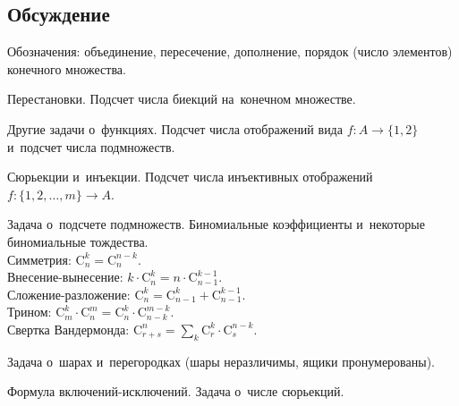 


\begingroup
    \def\binom#1#2{\mathrm{C}_{#1}^{#2}}%


\subsection*{Обсуждение}

\begin{exercises}

\item
Обозначения: объединение, пересечение, дополнение, порядок (число элементов)
конечного множества.

\item
Перестановки.
Подсчет числа биекций на~конечном множестве.

\item
Другие задачи о~функциях.
Подсчет числа отображений вида $f \colon A \to \{1, 2\}$ и~подсчет числа
подмножеств.

\item
Сюрьекции и~инъекции.
Подсчет числа инъективных отображений $f \colon \{1, 2, \ldots, m\} \to A$.

\item
Задача о~подсчете подмножеств.
Биномиальные коэффициенты и~некоторые биномиальные тождества.
\\
Симметрия: $\binom{n}{k} = \binom{n}{n-k}$.
\\
Внесение-вынесение: $k \cdot \binom{n}{k} = n \cdot \binom{n-1}{k-1}$.
\\
Сложение-разложение: $\binom{n}{k} = \binom{n-1}{k} + \binom{n-1}{k-1}$.
\\
Трином:
$\binom{m}{k} \cdot \binom{n}{m} = \binom{n}{k} \cdot \binom{n-k}{m-k}$.
\\
Свертка Вандермонда:
$\binom{r+s}{n} = \sum_{k} \binom{r}{k} \cdot \binom{s}{n-k}$.

\item
Задача о~шарах и~перегородках (шары неразличимы, ящики пронумерованы).

\item
Формула включений-исключений.
Задача о~числе сюрьекций.

\end{exercises}


